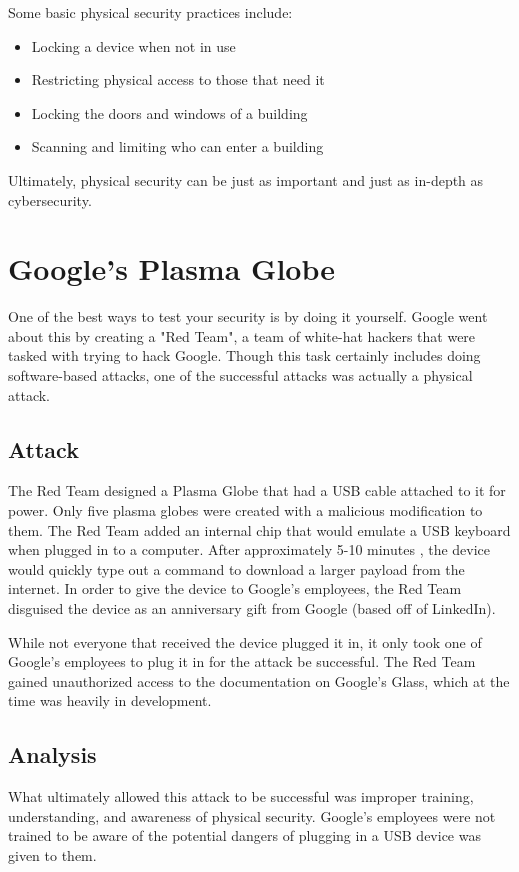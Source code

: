 \documentclass[acmlarge]{acmart}
\begin{document}
Some basic physical security practices include:
\begin{itemize}
  \item Locking a device when not in use
  \item Restricting physical access to those that need it
  \item Locking the doors and windows of a building
  \item Scanning and limiting who can enter a building
\end{itemize}

Ultimately, physical security can be just as important and just as in-depth
as cybersecurity. 

\section{Google's Plasma Globe \texorpdfstring{\cite{Google01}}{}} 
One of the best ways to test your security is by doing it yourself. Google
went about this by creating a "Red Team", a team of white-hat hackers that
were tasked with trying to hack Google. Though this task certainly includes
doing software-based attacks, one of the successful attacks was actually
a physical attack.

\subsection{Attack}
The Red Team designed a Plasma Globe that had a USB cable attached to it for power.
Only five plasma globes were created with a malicious modification to them.
The Red Team added an internal chip that would emulate a USB keyboard when plugged
in to a computer. After approximately 5-10 minutes \cite{lcamtuf}, the device
would quickly type out a command to download a larger payload from the internet.
In order to give the device to Google's employees, the Red Team disguised the
device as an anniversary gift from Google (based off of LinkedIn).

While not everyone that received the device plugged it in, it only took one of
Google's employees to plug it in for the attack be successful. The Red Team
gained unauthorized access to the documentation on Google's Glass, which
at the time was heavily in development.

\subsection{Analysis}
What ultimately allowed this attack to be successful was improper training, understanding,
and awareness of physical security. Google's employees were not trained to be aware
of the potential dangers of plugging in a USB device was given to them.
\end{document}
